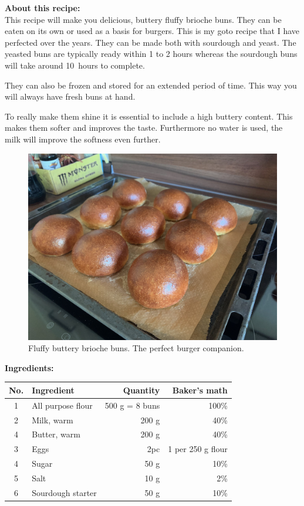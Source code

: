 \noindent\textbf{About this recipe:}\\
This recipe will make you delicious, buttery fluffy brioche buns. They
can be eaten on its own or used as a basis for burgers. This is my goto recipe
that I have perfected over the years. They can be made both with sourdough and
yeast. The yeasted buns are typically ready within 1 to 2 hours whereas the
sourdough buns will take around 10~hours to complete.

They can also be frozen and stored for an extended period of time. This
way you will always have fresh buns at hand.

To really make them shine it is essential to include a high buttery content.
This makes them softer and improves the taste. Furthermore no water is used,
the milk will improve the softness even further.

\begin{figure}[h]
    \centering
    \includegraphics[width=\textwidth]{brioche-buns}
    \caption{Fluffy buttery brioche buns. The perfect burger companion.}
\end{figure}

\noindent\textbf{Ingredients:}

\begin{center}
\begin{tabular}{|c|l|r|r|}
    \hline
    \textbf{No.} & \textbf{Ingredient} & \textbf{Quantity} & \textbf{Baker's math} \\
    \hline
    1 & All purpose flour & 500 g = 8 buns & 100\% \\
    \hline
    2 & Milk, warm & 200 g & 40\% \\
    \hline
    4 & Butter, warm & 200 g & 40\% \\
    \hline
    3 & Eggs & 2pc & 1 per 250 g flour \\
    \hline
    4 & Sugar & 50 g & 10\% \\
    \hline
    5 & Salt & 10 g & 2\% \\
    \hline
    6 & Sourdough starter & 50 g & 10\% \\
    \hline
\end{tabular}
\end{center}

